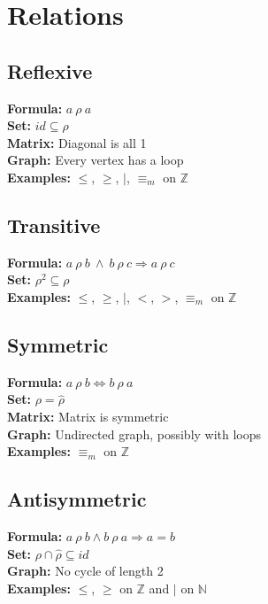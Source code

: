 \documentclass[11pt]{article}
\begin{document}
\section{Relations}

\begin{minipage}[t]{0.5\textwidth}
	\subsection{Reflexive}

	\textbf{Formula:} $a\ \rho\ a$ \\
	\textbf{Set:} $id \subseteq \rho$ \\
	\textbf{Matrix:} Diagonal is all 1\\
	\textbf{Graph:} Every vertex has a loop \\
	\textbf{Examples:} $\leq$, $\geq$, $|$, $\equiv_m$ on $\mathbb{Z}$
	
	\subsection{Transitive}

	\textbf{Formula:} $a\ \rho\ b\ \land\ b\ \rho\ c \Rightarrow a\ \rho\ c$ \\
	\textbf{Set:} $\rho^2 \subseteq \rho$ \\
	\textbf{Examples:} $\leq$, $\geq$, $|$, $<$, $>$, $\equiv_m$ on $\mathbb{Z}$
\end{minipage}
%
\begin{minipage}[t]{0.5\textwidth}
	\subsection{Symmetric}
	
	\textbf{Formula:} $a\ \rho\ b \Leftrightarrow b\ \rho\ a$ \\
	\textbf{Set:} $\rho = \hat{\rho}$\\
	\textbf{Matrix:} Matrix is symmetric \\
	\textbf{Graph:} Undirected graph, possibly with loops \\
	\textbf{Examples:} $\equiv_m$ on $\mathbb{Z}$
	
	\subsection{Antisymmetric}
	
	\textbf{Formula:} $a\ \rho\ b \land b\ \rho\ a \Rightarrow a = b$ \\
	\textbf{Set:} $\rho \cap \hat{\rho} \subseteq id$ \\
	\textbf{Graph:} No cycle of length 2\\
	\textbf{Examples:} $\leq$, $\geq$ on $\mathbb{Z}$ and $|$ on $\mathbb{N}$
\end{minipage}\\
\end{document}
